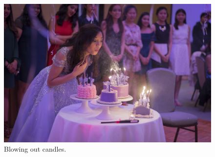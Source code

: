 \documentclass{report}
\begin{document}
\begin{figure}
  \includegraphics[width=\linewidth]{res/blowingoutcandles.jpg}
  \caption{Blowing out candles.}
\end{figure}
\end{document}
